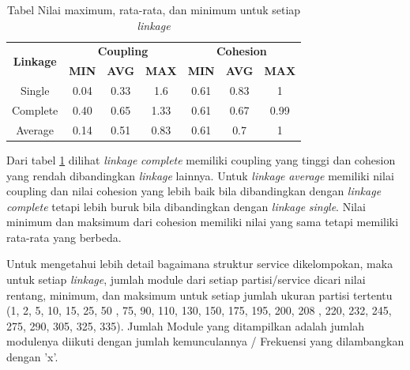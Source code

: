 \begin{table}[ht]
\centering
\begin{tabular}{|c|c|c|c|c|c|c|}
\hline
\multirow{2}{*}{\textbf{Linkage}} & \multicolumn{3}{c|}{\textbf{Coupling}} & \multicolumn{3}{c|}{\textbf{Cohesion}} \\
\cline{2-7}
&  \textbf{MIN} & \textbf{AVG} &  \textbf{MAX} &  \textbf{MIN} &  \textbf{AVG} & \textbf{MAX} \\
\hline
Single & 0.04 & 0.33 & 1.6    & 0.61 & 0.83 & 1 \\
Complete & 0.40 & 0.65 & 1.33 & 0.61 & 0.67 & 0.99 \\
Average & 0.14 & 0.51 & 0.83  & 0.61 & 0.7  & 1 \\
\hline
\end{tabular}
\caption{Tabel  Nilai maximum, rata-rata, dan minimum untuk setiap \textit{linkage}}
\label{tab:link_stat}
\end{table}

Dari tabel \ref{tab:link_stat} dilihat \textit{linkage} \textit{complete} memiliki coupling yang tinggi dan cohesion yang rendah dibandingkan \textit{linkage} lainnya. Untuk \textit{linkage} \textit{average} memiliki nilai coupling dan nilai cohesion yang lebih baik  bila dibandingkan dengan \textit{linkage} \textit{complete} tetapi lebih buruk bila dibandingkan dengan \textit{linkage} \textit{single}. Nilai  minimum dan maksimum dari cohesion memiliki nilai yang sama tetapi memiliki rata-rata yang berbeda. 

Untuk mengetahui lebih detail bagaimana struktur service dikelompokan, maka untuk setiap \textit{linkage}, jumlah module dari setiap partisi/service dicari nilai rentang, minimum, dan maksimum untuk setiap jumlah ukuran partisi tertentu (1, 2, 5, 10, 15, 25, 50 , 75, 90, 110, 130, 150, 175, 195, 200, 208 , 220, 232,  245, 275, 290, 305, 325, 335). Jumlah Module yang ditampilkan adalah jumlah modulenya diikuti dengan jumlah kemunculannya / Frekuensi yang dilambangkan dengan 'x'.

